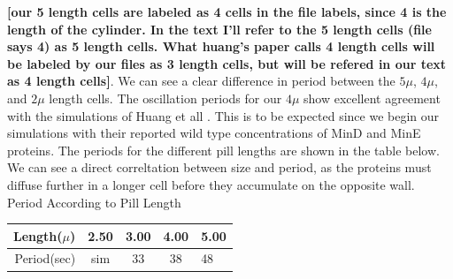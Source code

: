 \documentclass[letterpaper,twocolumn,amsmath,amssymb,pre]{revtex4-1}
\newcommand{\red}[1]{{\bf \color{red} #1}}
\newcommand{\fixme}[1]{\red{[#1]}}
\begin{document}
\fixme{our 5 length cells are labeled as 4 cells in the file labels,
  since 4 is the length of the cylinder. In the text I'll refer to the
  5 length cells (file says 4) as 5 length cells.  What huang's paper
  calls 4 length cells will be labeled by our files as 3 length cells,
  but will be refered in our text as 4 length cells}.  We can see a
clear difference in period between the $5\mu$, $4\mu$, and $2\mu$
length cells.  The oscillation periods for our $4\mu$ show excellent
agreement with the simulations of Huang et all
\cite{huang2003dynamic}.  This is to be expected since we begin our
simulations with their reported wild type concentrations of MinD and
MinE proteins. The periods for the different pill lengths are shown in
the table below.  We can see a direct correltation between size and
period, as the proteins must diffuse further in a longer cell before
they accumulate on the opposite wall.
\newline
\newline
Period According to Pill Length
\begin{tabular}{|r|c|c|c|l|}
  \hline
  Length($\mu$) & 2.50 & 3.00 & 4.00 & 5.00\\
  \hline
  Period(sec) & sim & 33 & 38 & 48 \\ \cline{2-2}
  \hline
\end{tabular}
\newline
\newline
\end{document}

